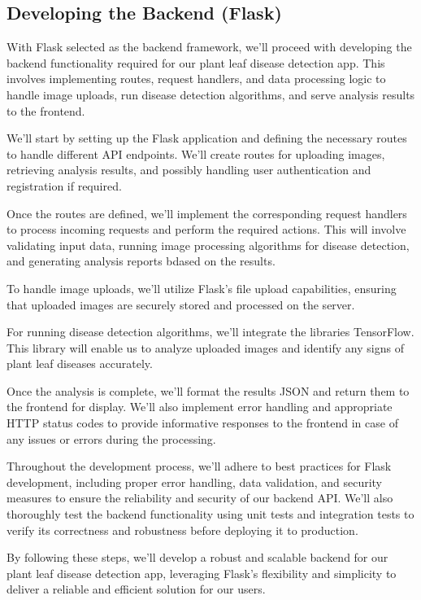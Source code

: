 \documentclass{article}
\begin{document}
\subsection{Developing the Backend (Flask)}

With Flask selected as the backend framework, we'll proceed with developing the backend functionality required for our plant leaf disease detection app. This involves implementing routes, request handlers, and data processing logic to handle image uploads, run disease detection algorithms, and serve analysis results to the frontend.

We'll start by setting up the Flask application and defining the necessary routes to handle different API endpoints. We'll create routes for uploading images, retrieving analysis results, and possibly handling user authentication and registration if required.

Once the routes are defined, we'll implement the corresponding request handlers to process incoming requests and perform the required actions. This will involve validating input data, running image processing algorithms for disease detection, and generating analysis reports bdased on the results.

To handle image uploads, we'll utilize Flask's file upload capabilities, ensuring that uploaded images are securely stored and processed on the server.

For running disease detection algorithms, we'll integrate the libraries TensorFlow. This library will enable us to analyze uploaded images and identify any signs of plant leaf diseases accurately.

Once the analysis is complete, we'll format the results JSON and return them to the frontend for display. We'll also implement error handling and appropriate HTTP status codes to provide informative responses to the frontend in case of any issues or errors during the processing.

Throughout the development process, we'll adhere to best practices for Flask development, including proper error handling, data validation, and security measures to ensure the reliability and security of our backend API. We'll also thoroughly test the backend functionality using unit tests and integration tests to verify its correctness and robustness before deploying it to production.

By following these steps, we'll develop a robust and scalable backend for our plant leaf disease detection app, leveraging Flask's flexibility and simplicity to deliver a reliable and efficient solution for our users.
\end{document}
